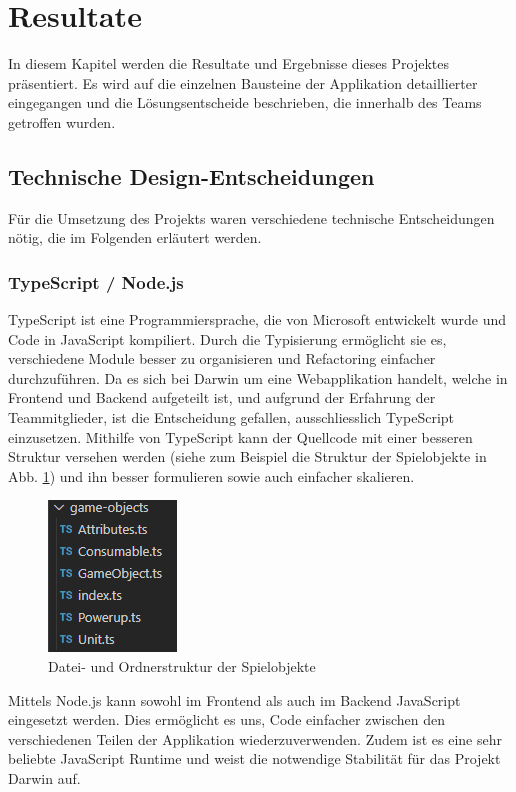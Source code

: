 \documentclass[11pt,a4paper,titlepage]{article}
\begin{document}
\newpage

\section{Resultate}
In diesem Kapitel werden die Resultate und Ergebnisse dieses Projektes präsentiert.
Es wird auf die einzelnen Bausteine der Applikation detaillierter eingegangen und die Lösungsentscheide beschrieben, die innerhalb des Teams getroffen wurden.

\subsection{Technische Design-Entscheidungen}
Für die Umsetzung des Projekts waren verschiedene technische Entscheidungen nötig, die im Folgenden erläutert werden.
\subsubsection{TypeScript / Node.js}
TypeScript ist eine Programmiersprache, die von Microsoft entwickelt wurde und Code in JavaScript kompiliert. Durch die Typisierung ermöglicht sie es, verschiedene Module besser zu organisieren und Refactoring einfacher durchzuführen.
Da es sich bei Darwin um eine Webapplikation handelt, welche in Frontend und Backend aufgeteilt ist, und aufgrund der Erfahrung der Teammitglieder, ist die Entscheidung gefallen, ausschliesslich TypeScript einzusetzen.
Mithilfe von TypeScript kann der Quellcode mit einer besseren Struktur versehen werden (siehe zum Beispiel die Struktur der Spielobjekte in Abb. \ref{types}) und ihn besser formulieren sowie auch einfacher skalieren.

\begin{figure}[H]
	\centering
	\includegraphics{darwintypes.png}
	\caption{Datei- und Ordnerstruktur der Spielobjekte}
	\label{types}
\end{figure}

Mittels Node.js kann sowohl im Frontend als auch im Backend JavaScript eingesetzt werden. Dies ermöglicht es uns, Code einfacher zwischen den verschiedenen Teilen der Applikation wiederzuverwenden. Zudem ist es eine sehr beliebte JavaScript Runtime \cite{node-git} und weist die notwendige Stabilität für das Projekt Darwin auf.
\end{document}
